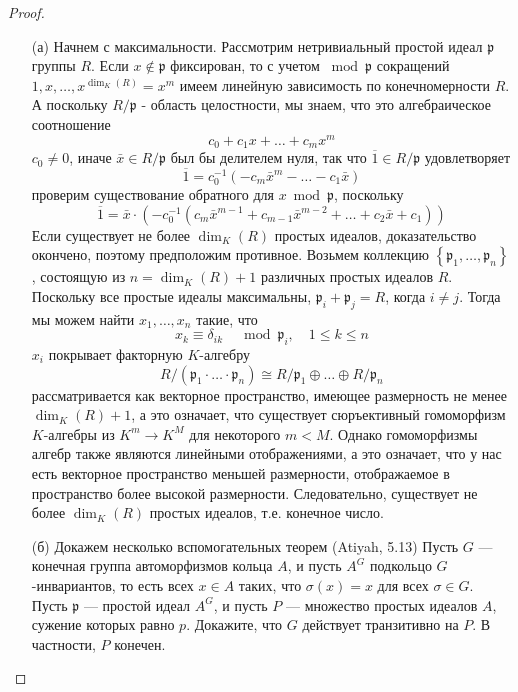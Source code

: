 \begin{proof}
\begin{itemize}
\item[]
\item[(а)] Начнем с максимальности. Рассмотрим нетривиальный простой идеал $\mathfrak{p}$ группы $R$. Если $x \notin \mathfrak{p}$ фиксирован, то с учетом $\bmod \mathfrak{p}$ сокращений $1, x, \ldots, x^{\operatorname{dim}_K(R)}=x^m$ имеем линейную зависимость по конечномерности $R$. А поскольку $R / \mathfrak{p}$ - область целостности, мы знаем, что это алгебраическое соотношение
$$
c_0+c_1 x+\ldots+c_m x^m
$$
$c_0 \neq 0$, иначе $\bar{x} \in R / \mathfrak{p}$ был бы делителем нуля, так что $\overline{1} \in R / \mathfrak{p }$ удовлетворяет
$$
\overline{1}=c_0^{-1}\left(-c_m \bar{x}^m-\ldots-c_1 \bar{x}\right)
$$
проверим существование обратного для $x \bmod \mathfrak{p}$, поскольку
$$
\overline{1}=\bar{x} \cdot\left(-c_0^{-1}\left(c_m \bar{x}^{m-1}+c_{m-1} \bar{x}^{m-2}+\ldots+c_2 \bar{x}+c_1\right)\right)
$$
Если существует не более $\operatorname{dim}_K(R)$ простых идеалов, доказательство окончено, поэтому предположим противное. Возьмем коллекцию $\left\{\mathfrak{p}_1, \ldots, \mathfrak{p}_n\right\}$, состоящую из $n=\operatorname{dim}_K(R)+1$ различных простых идеалов $R$. Поскольку все простые идеалы максимальны, $\mathfrak{p}_i+\mathfrak{p}_j=R$, когда $i \neq j$. Тогда мы можем найти $x_1, \ldots, x_n$ такие, что
$$
x_k \equiv \delta_{i k} \quad \bmod \mathfrak{p}_i, \quad 1 \leq k \leq n
$$
$x_i$ покрывает факторную $K$-алгебру
$$
R /\left(\mathfrak{p}_1 \cdot \ldots \cdot \mathfrak{p}_n\right) \cong R / \mathfrak{p}_1 \oplus \ldots \oplus R / \mathfrak{p}_n
$$
рассматривается как векторное пространство, имеющее размерность не менее $\operatorname{dim}_K(R)+1$, а это означает, что существует сюръективный гомоморфизм $K$-алгебры из $K^m \rightarrow K^M$ для некоторого $m < M$. Однако гомоморфизмы алгебр также являются линейными отображениями, а это означает, что у нас есть векторное пространство меньшей размерности, отображаемое в пространство более высокой размерности. Следовательно, существует не более $\operatorname{dim}_K(R)$ простых идеалов, т.е. конечное число.

\item[(б)]
Докажем несколько вспомогательных теорем
(Atiyah, 5.13) Пусть $G$ — конечная группа автоморфизмов кольца $A$, и пусть $A^G$ подкольцо $G$-инвариантов, то есть всех $x \in A$ таких, что $\sigma(x)=x$ для всех $\sigma\in G$. Пусть $\mathfrak{p}$ — простой идеал $A^G$, и пусть $P$ — множество простых идеалов $A$, сужение которых равно $p$. Докажите, что $G$ действует транзитивно на $P$. В частности, $P$ конечен.


\end{itemize}
\end{proof}
